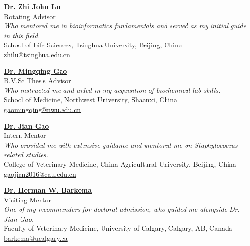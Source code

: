 \vspace{4pt}


\textbf{\href{https://life.tsinghua.edu.cn/lifeen/info/1034/1083.htm}{Dr. Zhi John Lu}}\\
Rotating Advisor\\
\textit{Who mentored me in bioinformatics fundamentals and served as my initial guide in this field.}\\
School of Life Sciences, Tsinghua University, Beijing, China\\
\href{mailto:zhilu@tsinghua.edu.cn}{zhilu@tsinghua.edu.cn}\\

\vspace{4pt}


\textbf{\href{https://faculty.nwu.edu.cn/gaomingqing/zh_CN/index.htm}{Dr. Mingqing Gao}}\\
B.V.Sc Thesis Advisor\\
\textit{Who instructed me and aided in my acquisition of biochemical lab skills.}\\
School of Medicine, Northwest University, Shaanxi, China\\
\href{mailto:gaomingqing@nwu.edu.cn}{gaomingqing@nwu.edu.cn}\\


\vspace{4pt}


\textbf{\href{https://cvm.cau.edu.cn/art/2017/9/12/art_41957_71.html}{Dr. Jian Gao}}\\
Intern Mentor \\
\textit{Who provided me with extensive guidance and mentored me on \textit{Staphylococcus}-related studies.} \\
College of Veterinary Medicine, China Agricultural University, Beijing, China\\
\href{mailto:gaojian2016@cau.edu.cn}{gaojian2016@cau.edu.cn}\\

\vspace{4pt}

\textbf{\href{https://profiles.ucalgary.ca/herman-barkema}{Dr. Herman W. Barkema}}\\
Visiting Mentor\\
\textit{One of my recommenders for doctoral admission, who guided me alongside Dr. Jian Gao.} \\
Faculty of Veterinary Medicine, University of Calgary, Calgary, AB, Canada\\
\href{mailto:barkema@ucalgary.ca}{barkema@ucalgary.ca}\\

